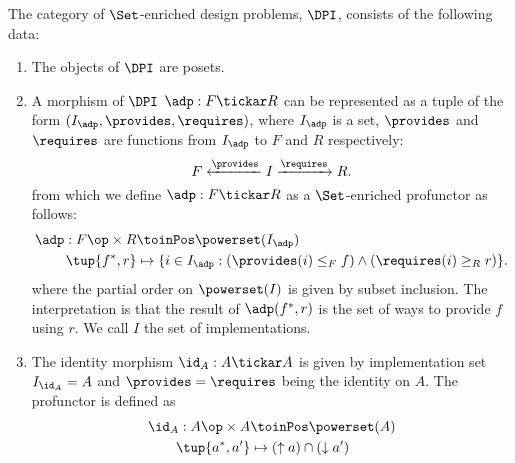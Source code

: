\begin{definition}
The category of $\Set$-enriched design problems, $\DPI$, consists of the following data:
\begin{enumerate}
\item The objects of $\DPI$ are posets.
\item A morphism of $\DPI$ $\adp : F \tickar R$ can be represented as a tuple of the form $(I_\adp, \provides, \requires)$, where $I_\adp$ is a set, $\provides$ and $\requires$ are functions from $I_\adp$ to $F$ and $R$ respectively:
\begin{equation}
    F \xleftarrow{\provides} I \xrightarrow{\requires} R.
\end{equation}
from which we define $\adp : F \tickar R$ as a $\Set$-enriched profunctor as follows:
\begin{equation}
\begin{aligned}
\adp : F\op \times R &\toinPos \powerset(I_\adp) \\
\tup{f^*, r} &\mapsto \{ i \in I_\adp : (\provides(i) \leq_F f) \wedge (\requires(i) \geq_R r) \}.
\end{aligned}
\end{equation}
where the partial order on $\powerset(I)$ is given by subset inclusion.
 The interpretation is that the result of $\adp(f^*, r)$ is the set of ways to provide $f$ using $r$.
 We call $I$ the set of implementations.

\item The identity morphism $\id_A : A \tickar A$ is given by implementation set $I_{\id_A} = A$ and $\provides=\requires$ being
the identity on $A$. The profunctor is defined as
\begin{equation}
\begin{aligned}
\id_A : A\op \times A &\toinPos \powerset(A) \\
\tup{a^*,a'} &\mapsto (\uparrow a) \cap (\downarrow a')
\end{aligned}
\end{equation}


\end{enumerate}
\end{definition}
